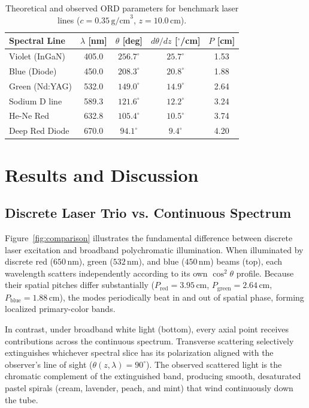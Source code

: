 \documentclass[twocolumn,10pt,a4paper]{article}
\begin{document}
\begin{table}[b]
  \centering
  \scriptsize
  \setlength{\tabcolsep}{3.5pt}
  \caption{Theoretical and observed ORD parameters for benchmark laser lines ($c = 0.35\,\text{g/cm}^3$, $z = 10.0\,\text{cm}$).}
  \label{tab:lasers}
  \begin{tabular}{lcccc}
    \toprule
    \textbf{Spectral Line} & $\lambda$ [nm] & $\theta$ [deg] & $d\theta/dz$ [$^\circ$/cm] & $P$ [cm] \\
    \midrule
    Violet (InGaN)  & 405.0 & $256.7^\circ$ & $25.7^\circ$ & 1.53 \\
    Blue (Diode)    & 450.0 & $208.3^\circ$ & $20.8^\circ$ & 1.88 \\
    Green (Nd:YAG)  & 532.0 & $149.0^\circ$ & $14.9^\circ$ & 2.64 \\
    Sodium D line   & 589.3 & $121.6^\circ$ & $12.2^\circ$ & 3.24 \\
    He-Ne Red       & 632.8 & $105.4^\circ$ & $10.5^\circ$ & 3.74 \\
    Deep Red Diode  & 670.0 & $94.1^\circ$  & $9.4^\circ$  & 4.20 \\
    \bottomrule
  \end{tabular}
\end{table}

\section{Results and Discussion}

\subsection{Discrete Laser Trio vs. Continuous Spectrum}
Figure~\ref{fig:comparison} illustrates the fundamental difference between discrete laser excitation and broadband polychromatic illumination. When illuminated by discrete red ($650\,\text{nm}$), green ($532\,\text{nm}$), and blue ($450\,\text{nm}$) beams (top), each wavelength scatters independently according to its own $\cos^2\theta$ profile. Because their spatial pitches differ substantially ($P_{\text{red}} = 3.95\,\text{cm}$, $P_{\text{green}} = 2.64\,\text{cm}$, $P_{\text{blue}} = 1.88\,\text{cm}$), the modes periodically beat in and out of spatial phase, forming localized primary-color bands.

In contrast, under broadband white light (bottom), every axial point receives contributions across the continuous spectrum. Transverse scattering selectively extinguishes whichever spectral slice has its polarization aligned with the observer's line of sight ($\theta(z, \lambda) = 90^\circ$). The observed scattered light is the chromatic complement of the extinguished band, producing smooth, desaturated pastel spirals (cream, lavender, peach, and mint) that wind continuously down the tube.
\end{document}
